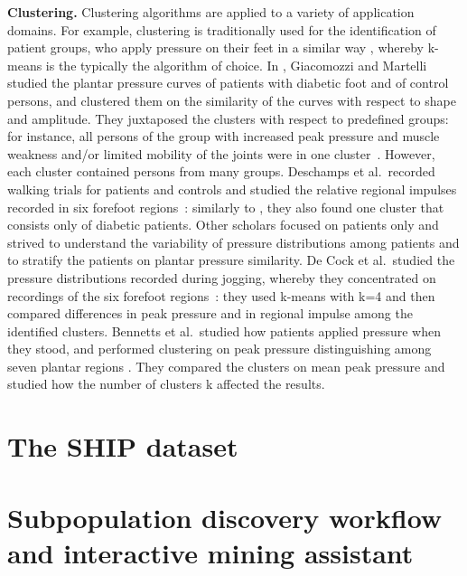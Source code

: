 \documentclass[
]{book}
\begin{document}
\textbf{Clustering.} Clustering algorithms are applied to a variety of application domains.
For example, clustering is traditionally used for the identification of patient groups, who apply pressure on their feet in a similar way \autocite{BennettsEtAl:Biomechanics2013,DeCockEtAl:FootTypeClusteringPlantarPressure2006,DeschampsEtAL:KMeansDiabeticFoot2013,GiacomozziMartelli:PeakPressure2006}, whereby k-means is the typically the algorithm of choice.
In \autocite{GiacomozziMartelli:PeakPressure2006}, Giacomozzi and Martelli
studied the plantar pressure curves of patients with diabetic foot and of control persons, and clustered them on the similarity of the curves with respect to shape and amplitude. They juxtaposed the clusters with respect to predefined groups: for instance, all persons of the group with increased peak pressure and muscle weakness and/or limited mobility of the joints were in one cluster~\autocite{GiacomozziMartelli:PeakPressure2006}.
However, each cluster contained persons from many groups.
Deschamps et al.~recorded walking trials for patients and controls and studied the relative regional impulses recorded in six forefoot regions~\autocite{DeschampsEtAL:KMeansDiabeticFoot2013}: similarly to \autocite{GiacomozziMartelli:PeakPressure2006}, they also found one cluster that consists only of diabetic patients.
Other scholars focused on patients only and strived to understand the variability of pressure distributions among patients and to stratify the patients on plantar pressure similarity.
De Cock et al.~studied the pressure distributions recorded during jogging, whereby they concentrated on recordings of the six forefoot regions~\autocite{DeCockEtAl:FootTypeClusteringPlantarPressure2006}: they used k-means with k=4 and then
compared differences in peak pressure and in regional impulse among the identified clusters.
Bennetts et al.~studied how patients applied pressure when they stood, and performed clustering on peak pressure
distinguishing among seven plantar regions \autocite{BennettsEtAl:Biomechanics2013}.
They compared the clusters on mean peak pressure and studied how the number of clusters k affected the results.

\hypertarget{the-ship-dataset}{%
\section{The SHIP dataset}\label{the-ship-dataset}}

\hypertarget{subpopulation-discovery-workflow-and-interactive-mining-assistant}{%
\section{Subpopulation discovery workflow and interactive mining assistant}\label{subpopulation-discovery-workflow-and-interactive-mining-assistant}}
\end{document}
